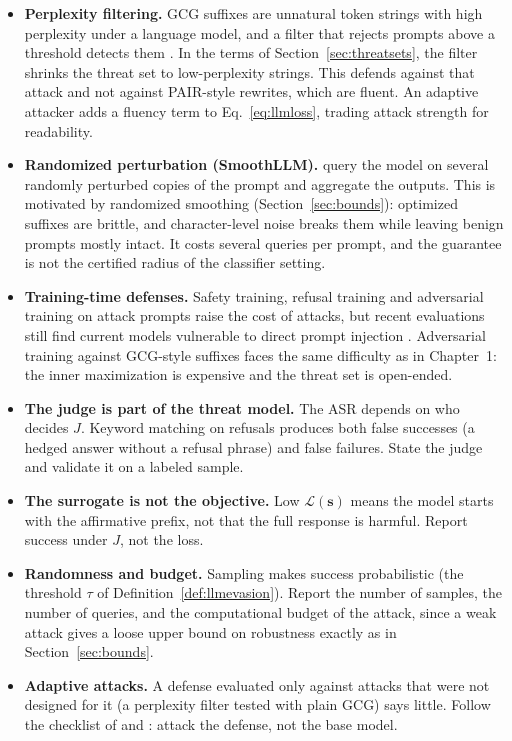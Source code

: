 \documentclass[10pt,a4paper]{extarticle}
\theoremstyle{definition}
\newcommand{\Loss}{\mathcal{L}}
\begin{document}
\begin{itemize}
  \item \textbf{Perplexity filtering.} GCG suffixes are unnatural token strings with high perplexity under a language model, and a filter that rejects prompts above a threshold detects them \citep{jain2023baseline}. In the terms of Section~\ref{sec:threatsets}, the filter shrinks the threat set to low-perplexity strings. This defends against that attack and not against PAIR-style rewrites, which are fluent. An adaptive attacker adds a fluency term to Eq.~\eqref{eq:llmloss}, trading attack strength for readability.
  \item \textbf{Randomized perturbation (SmoothLLM).} \citet{robey2023smoothllm} query the model on several randomly perturbed copies of the prompt and aggregate the outputs. This is motivated by randomized smoothing (Section~\ref{sec:bounds}): optimized suffixes are brittle, and character-level noise breaks them while leaving benign prompts mostly intact. It costs several queries per prompt, and the guarantee is not the certified radius of the classifier setting.
  \item \textbf{Training-time defenses.} Safety training, refusal training and adversarial training on attack prompts raise the cost of attacks, but recent evaluations still find current models vulnerable to direct prompt injection \citep{nist2025ai1002}. Adversarial training against GCG-style suffixes faces the same difficulty as in Chapter~1: the inner maximization is expensive and the threat set is open-ended.
\end{itemize}

\begin{warnbox}
\begin{itemize}
  \item \textbf{The judge is part of the threat model.} The ASR depends on who decides \(J\). Keyword matching on refusals produces both false successes (a hedged answer without a refusal phrase) and false failures. State the judge and validate it on a labeled sample.
  \item \textbf{The surrogate is not the objective.} Low \(\Loss(\mathbf{s})\) means the model starts with the affirmative prefix, not that the full response is harmful. Report success under \(J\), not the loss.
  \item \textbf{Randomness and budget.} Sampling makes success probabilistic (the threshold \(\tau\) of Definition~\ref{def:llmevasion}). Report the number of samples, the number of queries, and the computational budget of the attack, since a weak attack gives a loose upper bound on robustness exactly as in Section~\ref{sec:bounds}.
  \item \textbf{Adaptive attacks.} A defense evaluated only against attacks that were not designed for it (a perplexity filter tested with plain GCG) says little. Follow the checklist of \citet{carlini2019evaluating} and \citet{tramer2020adaptive}: attack the defense, not the base model.
\end{itemize}
\end{warnbox}
\end{document}
